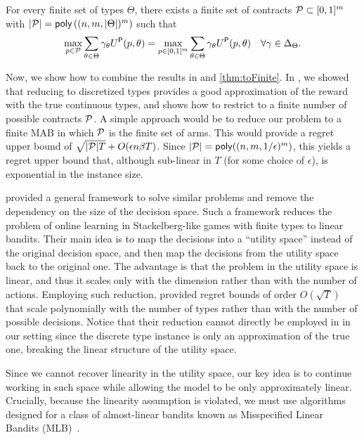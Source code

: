 \begin{theorem}\label{thm:toFinite}
    For every finite set of types $\Theta$, there exists a finite set of contracts $\mathcal{P}\subset [0,1]^m$ with $|\mathcal{P}|= \textsf{poly}\left((n,m,|\Theta|)^m\right)$ such that
    \[
    \max_{p\in \mathcal{P}} \sum_{\theta\in \Theta}  \gamma_\theta U^\textsf{P}(p, \theta) = \max_{p\in [0,1]^m} \sum_{\theta\in \Theta}  \gamma_\theta U^\textsf{P}(p, \theta)\quad  \forall \gamma \in \Delta_{\Theta}.
    \]
\end{theorem} 


Now, we show how to combine the results in  and \cref{thm:toFinite}.
%
In , we showed that reducing to discretized types provides a good approximation of the reward with the true continuous types, and  shows how to restrict to a finite number of possible contracts $\mathcal{P}$. A simple approach would be to reduce our problem to a finite MAB in which $\mathcal{P}$ is the finite set of arms. This would provide a regret upper bound of $\sqrt{|\mathcal{P}| T}+O(\epsilon n\beta T)$. Since $|\mathcal{P}|=\textsf{poly}((n,m,1/\epsilon)^m)$, this yields a regret upper bound that, although sub-linear in 
$T$ (for some choice of $\epsilon$), is  exponential in the instance size. 

\citet{bernasconi2023optimal} provided a general framework to solve similar problems and remove the dependency on the size of the decision space.
Such a framework reduces the problem of online learning in Stackelberg-like games with finite types to linear bandits. Their main idea is to map the decisions into a ``utility space'' instead of the original decision space, and then map the decisions from the utility space back to the original one. The advantage is that the problem in the utility space is linear, and thus it scales only with the dimension rather than with the number of actions.
%
Employing such reduction, \citet{bernasconi2023optimal} provided regret bounds of order $O(\sqrt{T})$ that scale polynomially with the number of types rather than with the number of possible decisions.
%
Notice that their reduction cannot directly be employed in in our setting since the discrete type instance is only an approximation of the true one, breaking the linear structure of the utility space.

Since we cannot recover linearity in the utility space, our key idea is to continue working in such space while allowing the model to be only approximately linear. Crucially, because the linearity assumption is violated, we must use algorithms designed for a class of almost-linear bandits known as Misspecified Linear Bandits (MLB)~\cite{ghosh2017misspecified}.


